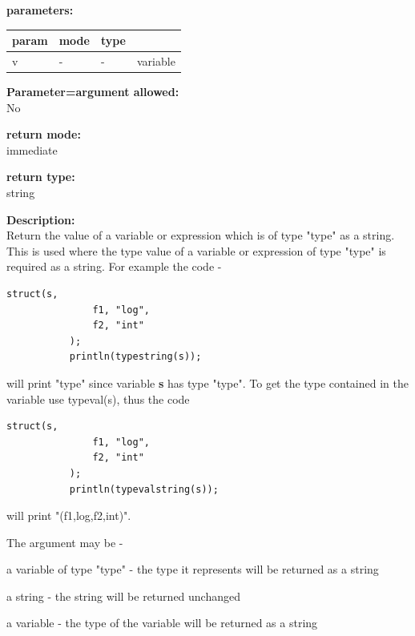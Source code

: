         {\bf parameters:} \\
        \begin{tabular}{| l | l | l | l |}
        \hline
        param  & mode & type & \\
        \hline \hline
        v & - &  -  & variable \\ \hline
        \end{tabular}
        
        {\bf Parameter=argument allowed:} \\
        No
        
        {\bf return mode:} \\
        immediate

        {\bf return type:} \\
        string
        
        {\bf Description:} \\
        Return the value of a variable or expression which is of type "type"
        as a string.
        This is used where the type value of a variable or expression of type "type"
        is required as a string. For example the code -
        \begin{lstlisting}[gobble=8, language=threepl]
           struct(s,
               f1, "log",
               f2, "int"
           );
           println(typestring(s));
        \end{lstlisting}
        will print "type" since variable {\bf s} has type "type". To get the type
        contained in the variable use typeval(s), thus the code
        \begin{lstlisting}[gobble=8, language=threepl]
           struct(s,
               f1, "log",
               f2, "int"
           );
           println(typevalstring(s));
        \end{lstlisting}
        will print "(f1,log,f2,int)".
        
        The argument may be -
        \blist
        \item   a variable of type "type" - the type it represents will
                be returned as a string
        \item   a string - the string will be returned unchanged
        \item   a variable - the type of the variable will be returned
                as a string
        \blend
        
